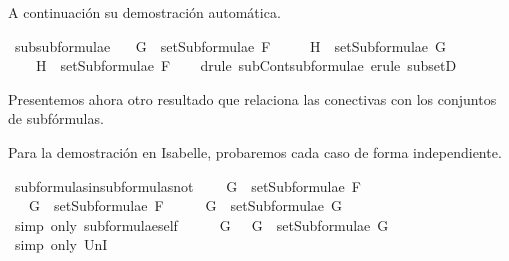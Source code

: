 \begin{isabellebody}
%
\endisatagproof
{\isafoldproof}%
%
\isadelimproof
%
\endisadelimproof
%
\begin{isamarkuptext}%
A continuación su demostración automática.%
\end{isamarkuptext}\isamarkuptrue%
\isamarkupfalse%
\ subsubformulae{\isacharcolon}\ \isanewline
\ \ {\isachardoublequoteopen}G\ {\isasymin}\ setSubformulae\ F\ \isanewline
\ \ \ {\isasymLongrightarrow}\ H\ {\isasymin}\ setSubformulae\ G\ \isanewline
\ \ \ {\isasymLongrightarrow}\ H\ {\isasymin}\ setSubformulae\ F{\isachardoublequoteclose}\isanewline
%
\isadelimproof
\ \ %
\endisadelimproof
%
\isatagproof
{}\isamarkupfalse%
\ {\isacharparenleft}drule\ subContsubformulae{\isacharcomma}\ erule\ subsetD{\isacharparenright}%
\endisatagproof
{\isafoldproof}%
%
\isadelimproof
%
\endisadelimproof
%
\begin{isamarkuptext}%
Presentemos ahora otro resultado que relaciona las conectivas
  con los conjuntos de subfórmulas.%
\end{isamarkuptext}\isamarkuptrue%
%
\begin{isamarkuptext}%
Para la demostración en Isabelle, probaremos cada caso de forma
 independiente.%
\end{isamarkuptext}\isamarkuptrue%
\isamarkupfalse%
\ subformulas{\isacharunderscore}in{\isacharunderscore}subformulas{\isacharunderscore}not{\isacharcolon}\isanewline
\ \ \ {\isachardoublequoteopen}\isactrlbold {\isasymnot}\ G\ {\isasymin}\ setSubformulae\ F{\isachardoublequoteclose}\isanewline
\ \ \ {\isachardoublequoteopen}G\ {\isasymin}\ setSubformulae\ F{\isachardoublequoteclose}\isanewline
%
\isadelimproof
%
\endisadelimproof
%
\isatagproof
{}\isamarkupfalse%
\ {\isacharminus}\isanewline
\ \ \isamarkupfalse%
\ {\isachardoublequoteopen}G\ {\isasymin}\ setSubformulae\ G{\isachardoublequoteclose}\isanewline
\ \ \ \ \isamarkupfalse%
\ {\isacharparenleft}simp\ only{\isacharcolon}\ subformulae{\isacharunderscore}self{\isacharparenright}\isanewline
\ \ \isamarkupfalse%
\ \isamarkupfalse%
\ {\isachardoublequoteopen}G\ {\isasymin}\ {\isacharbraceleft}\isactrlbold {\isasymnot}\ G{\isacharbraceright}\ {\isasymunion}\ setSubformulae\ G{\isachardoublequoteclose}\isanewline
\ \ \ \ \isamarkupfalse%
\ {\isacharparenleft}simp\ only{\isacharcolon}\ UnI{}{\isacharparenright}\isanewline
\ \ \isamarkupfalse%
\ \isamarkupfalse%

\end{isabellebody}

